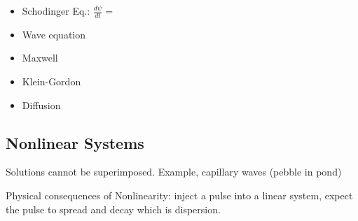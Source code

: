 \documentclass[]{article}
\begin{document}
\begin{itemize}
	\item Schodinger Eq.: $\frac{d\psi}{dt} = $
	\item Wave equation
	\item Maxwell
	\item Klein-Gordon
	\item Diffusion
\end{itemize}

\subsection{Nonlinear Systems}

Solutions cannot be superimposed. Example, capillary waves (pebble in pond)

Physical consequences of Nonlinearity: inject a pulse into a linear system, expect the pulse to spread and decay which is dispersion.
\end{document}
